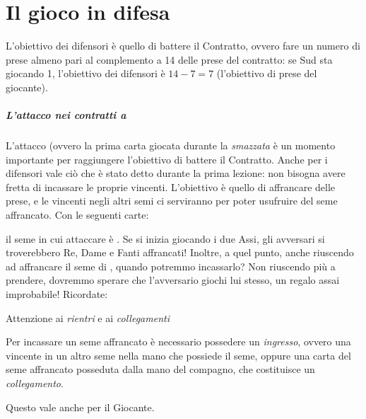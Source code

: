\documentclass[../corsofiori.tex]{subfiles}
\begin{document}
\setcounter{chapter}{1}
\setcounter{regolactr}{2}
\chapter{Il gioco in difesa}

L'obiettivo dei difensori è quello di battere il Contratto, ovvero fare un numero di prese almeno pari al complemento a
14 delle prese del contratto: se Sud sta giocando 1\SA, l'obiettivo dei difensori è $14 - 7 = 7$ (l'obiettivo di prese del
giocante).

\paragraph{L'attacco nei contratti a \SA}

L'attacco (ovvero la prima carta giocata durante la \emph{smazzata} è un momento importante per raggiungere l'obiettivo di battere il
Contratto.
Anche per i difensori vale ciò che è stato detto durante la prima lezione: non bisogna avere fretta di incassare le
proprie vincenti. L'obiettivo è quello di affrancare delle prese, e le vincenti negli altri semi ci serviranno per poter
usufruire del seme affrancato.
Con le seguenti carte:
\begin{center}
\end{center}
il seme in cui attaccare è \fio. Se si inizia giocando i due Assi, gli avversari si troverebbero Re, Dame e Fanti
affrancati! Inoltre, a quel punto, anche riuscendo ad affrancare il seme di \fio, quando potremmo incassarlo? Non
riuscendo più a prendere, dovremmo sperare che l'avversario giochi \fio lui stesso, un regalo assai improbabile!
Ricordate:

\medskip
\begin{attenzione}{Attenzione ai \emph{rientri} e ai \emph{collegamenti}}

    Per incassare un seme affrancato è necessario possedere un \emph{ingresso}, ovvero una vincente in un altro seme
    nella mano che possiede il seme, oppure una carta del seme affrancato posseduta dalla mano del compagno, che
    costituisce un \emph{collegamento}.

\end{attenzione}

\medskip

Questo vale anche per il Giocante.
\end{document}
